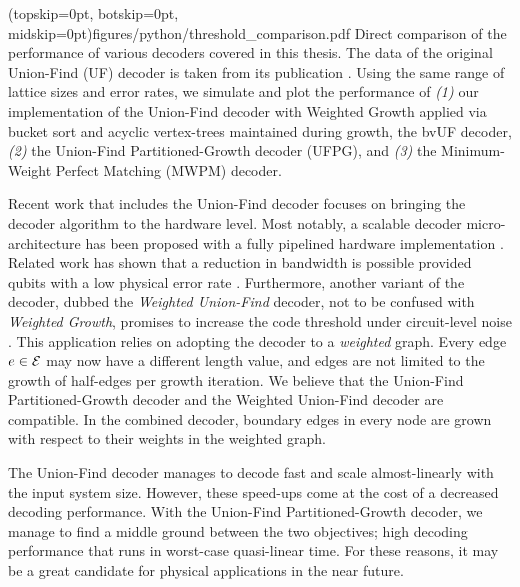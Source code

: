 \Figure[htb!](topskip=0pt, botskip=0pt, midskip=0pt){figures/python/threshold_comparison.pdf}{
  Direct comparison of the performance of various decoders covered in this thesis. The data of the original Union-Find (UF) decoder is taken from its publication \cite{delfosse2017almost}. Using the same range of lattice sizes and error rates, we simulate and plot the performance of \emph{(1)} our implementation of the Union-Find decoder with Weighted Growth applied via bucket sort and acyclic vertex-trees maintained during growth, the bvUF decoder, \emph{(2)} the Union-Find Partitioned-Growth decoder (UFPG), and  \emph{(3)} the Minimum-Weight Perfect Matching (MWPM) decoder.\label{thres_comp}}

Recent work that includes the Union-Find decoder focuses on bringing the decoder algorithm to the hardware level. Most notably, a scalable decoder micro-architecture has been proposed with a fully pipelined hardware implementation \cite{das2020scalable}. Related work has shown that a reduction in bandwidth is possible provided qubits with a low physical error rate \cite{delfosse2020hierarchical}. Furthermore, another variant of the decoder, dubbed the \emph{Weighted Union-Find} decoder, not to be confused with \emph{Weighted Growth}, promises to increase the code threshold under circuit-level noise \cite{huang2020fault}. This application relies on adopting the decoder to a \emph{weighted} graph. Every edge $e\in\mathcal{E}$ may now have a different length value, and edges are not limited to the growth of half-edges per growth iteration. We believe that the Union-Find Partitioned-Growth decoder and the Weighted Union-Find decoder are compatible. In the combined decoder, boundary edges in every node are grown with respect to their weights in the weighted graph. 

The Union-Find decoder manages to decode fast and scale almost-linearly with the input system size. However, these speed-ups come at the cost of a decreased decoding performance. With the Union-Find Partitioned-Growth decoder, we manage to find a middle ground between the two objectives; high decoding performance that runs in worst-case quasi-linear time. For these reasons, it may be a great candidate for physical applications in the near future.

